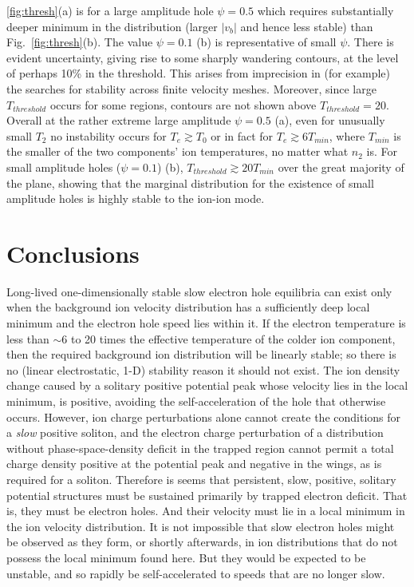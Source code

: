 \documentclass[12pt]{article}
\begin{document}
\ref{fig:thresh}(a) is for a large amplitude hole $\psi=0.5$ which
requires substantially deeper minimum in the distribution (larger
$|v_b|$ and hence less stable) than Fig.\ \ref{fig:thresh}(b). The
value $\psi=0.1$ (b) is representative of small $\psi$. There is evident
uncertainty, giving rise to some sharply wandering contours, at the
level of perhaps 10\% in the threshold. This arises from imprecision
in (for example) the searches for stability across finite velocity
meshes. Moreover, since large $T_{threshold}$ occurs for some regions,
contours are not shown above $T_{threshold}=20$. Overall at the rather
extreme large amplitude $\psi=0.5$ (a), even for unusually small $T_2$
no instability occurs for $T_e\gtrsim T_0$ or in fact for
$T_e\gtrsim 6 T_{min}$, where $T_{min}$ is the smaller of the two
components' ion temperatures, no matter what $n_2$ is. For small
amplitude holes ($\psi=0.1$) (b), $T_{threshold}\gtrsim 20 T_{min}$
over the great majority of the plane, showing that the marginal
distribution for the existence of small amplitude holes is highly
stable to the ion-ion mode.

\section{Conclusions}



Long-lived one-dimensionally stable slow electron hole equilibria can
exist only when the background ion velocity distribution has a
sufficiently deep local minimum and the electron hole speed lies
within it. If the electron temperature is less than $\sim 6$ to 20
times the effective temperature of the colder ion component, then the
required background ion distribution will be linearly stable; so there
is no (linear electrostatic, 1-D) stability reason it should not
exist. The ion density change caused by a solitary positive potential
peak whose velocity lies in the local minimum, is positive, avoiding
the self-acceleration of the hole that otherwise occurs. However, ion
charge perturbations alone cannot create the conditions for a
\emph{slow} positive soliton, and the electron charge perturbation of
a distribution without phase-space-density deficit in the trapped
region cannot permit a total charge density positive at the potential
peak and negative in the wings, as is required for a
soliton. Therefore is seems that persistent, slow, positive, solitary
potential structures must be sustained primarily by trapped electron
deficit. That is, they must be electron holes. And their velocity must
lie in a local minimum in the ion velocity distribution. It is not
impossible that slow electron holes might be observed as they form, or
shortly afterwards, in ion distributions that do not possess the local
minimum found here. But they would be expected to be unstable, and so
rapidly be self-accelerated to speeds that are no longer slow.
\end{document}
